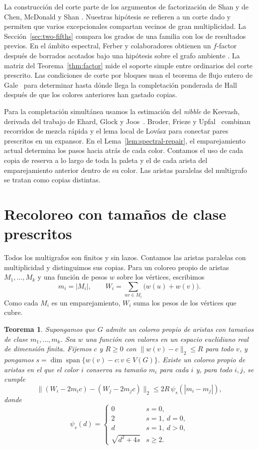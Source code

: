 \documentclass[11pt]{article}
\DeclareMathOperator{\spanof}{span}
\newtheorem{theorem}{Teorema}
\begin{document}
La construcción del corte parte de los argumentos de factorización de Shan y de Chen, McDonald y Shan \cite{Shan,CMS}. Nuestras hipótesis se refieren a un corte dado y permiten que varios excepcionales compartan vecinos de gran multiplicidad. La Sección~\ref{sec:two-fifths} compara los grados de una familia con los de resultados previos. En el ámbito espectral, Ferber y colaboradores obtienen un \(f\)-factor después de borrados acotados bajo una hipótesis sobre el grafo ambiente \cite[Lema~4.5]{FFMYZ}. La matriz del Teorema~\ref{thm:factor} mide el soporte simple entre ordinarios del corte prescrito. Las condiciones de corte por bloques usan el teorema de flujo entero de Gale~\cite{Gale} para determinar hasta dónde llega la completación ponderada de Hall después de que los colores anteriores han gastado copias.

Para la completación simultánea usamos la estimación del \emph{nibble} de Keevash, derivada del trabajo de Ehard, Glock y Joos~\cite{KeevashII,EGJ}. Broder, Frieze y Upfal~\cite{BFU} combinan recorridos de mezcla rápida y el lema local de Lovász para conectar pares prescritos en un expansor. En el Lema~\ref{lem:spectral-repair}, el emparejamiento actual determina los pasos hacia atrás de cada color. Contamos el uso de cada copia de reserva a lo largo de toda la paleta y el de cada arista del emparejamiento anterior dentro de su color. Las aristas paralelas del multigrafo se tratan como copias distintas.

\section{Recoloreo con tamaños de clase prescritos}\label{sec:weights}

Todos los multigrafos son finitos y sin lazos. Contamos las aristas paralelas con multiplicidad y distinguimos sus copias. Para un coloreo propio de aristas \(M_1,\ldots,M_k\) y una función de pesos \(w\) sobre los vértices, escribimos
\[
  m_i=|M_i|,\qquad W_i=\sum_{uv\in M_i}\bigl(w(u)+w(v)\bigr).
\]
Como cada \(M_i\) es un emparejamiento, \(W_i\) suma los pesos de los vértices que cubre.

\begin{theorem}\label{thm:balance}
Supongamos que \(G\) admite un coloreo propio de aristas con tamaños de clase \(m_1,\ldots,m_k\). Sea \(w\) una función con valores en un espacio euclidiano real de dimensión finita. Fijemos \(c\) y \(R\ge0\) con \(\|w(v)-c\|_2\le R\) para todo \(v\), y pongamos \(s=\dim\spanof\{w(v)-c:v\in V(G)\}\). Existe un coloreo propio de aristas en el que el color \(i\) conserva su tamaño \(m_i\) para cada \(i\) y, para todo \(i,j\), se cumple
\[
  \|(W_i-2m_i c)-(W_j-2m_j c)\|_2
  \le 2R\,\psi_s(|m_i-m_j|),
\]
donde
\[
 \psi_s(d)=
 \begin{cases}
   0 & s=0,\\
   2 & s=1,\ d=0,\\
   d & s=1,\ d>0,\\
   \sqrt{d^2+4s} & s\ge2.
 \end{cases}
\]
\end{theorem}
\end{document}
